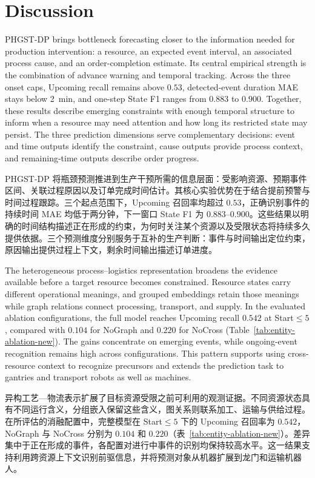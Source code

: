 \documentclass[a4paper,fleqn]{cas-dc}
\newcommand{\zhpara}[1]{%
  \par\begingroup\small\color{black!72}\noindent #1\par\endgroup}
\begin{document}
\section{Discussion}\label{sec:discussion}

PHGST-DP brings bottleneck forecasting closer to the information needed for production intervention: a resource, an expected event interval, an associated process cause, and an order-completion estimate. Its central empirical strength is the combination of advance warning and temporal tracking. Across the three onset caps, Upcoming recall remains above $0.53$, detected-event duration MAE stays below 2~min, and one-step State F1 ranges from $0.883$ to $0.900$. Together, these results describe emerging constraints with enough temporal structure to inform when a resource may need attention and how long its restricted state may persist. The three prediction dimensions serve complementary decisions: event and time outputs identify the constraint, cause outputs provide process context, and remaining-time outputs describe order progress.

\zhpara{PHGST-DP 将瓶颈预测推进到生产干预所需的信息层面：受影响资源、预期事件区间、关联过程原因以及订单完成时间估计。其核心实验优势在于结合提前预警与时间过程跟踪。三个起点范围下，Upcoming 召回率均超过 $0.53$，正确识别事件的持续时间 MAE 均低于两分钟，下一窗口 State F1 为 $0.883$--$0.900$。这些结果以明确的时间结构描述正在形成的约束，为何时关注某个资源以及受限状态将持续多久提供依据。三个预测维度分别服务于互补的生产判断：事件与时间输出定位约束，原因输出提供过程上下文，剩余时间输出描述订单进度。}

The heterogeneous process--logistics representation broadens the evidence available before a target resource becomes constrained. Resource states carry different operational meanings, and grouped embeddings retain those meanings while graph relations connect processing, transport, and supply. In the evaluated ablation configurations, the full model reaches Upcoming recall $0.542$ at Start$\leq5$, compared with $0.104$ for NoGraph and $0.220$ for NoCross (Table~\ref{tab:entity-ablation-new}). The gains concentrate on emerging events, while ongoing-event recognition remains high across configurations. This pattern supports using cross-resource context to recognize precursors and extends the prediction task to gantries and transport robots as well as machines.

\zhpara{异构工艺—物流表示扩展了目标资源受限之前可利用的观测证据。不同资源状态具有不同运行含义，分组嵌入保留这些含义，图关系则联系加工、运输与供给过程。在所评估的消融配置中，完整模型在 Start$\leq5$ 下的 Upcoming 召回率为 $0.542$，NoGraph 与 NoCross 分别为 $0.104$ 和 $0.220$（表~\ref{tab:entity-ablation-new}）。差异集中于正在形成的事件，各配置对进行中事件的识别均保持较高水平。这一结果支持利用跨资源上下文识别前驱信息，并将预测对象从机器扩展到龙门和运输机器人。}
\end{document}
